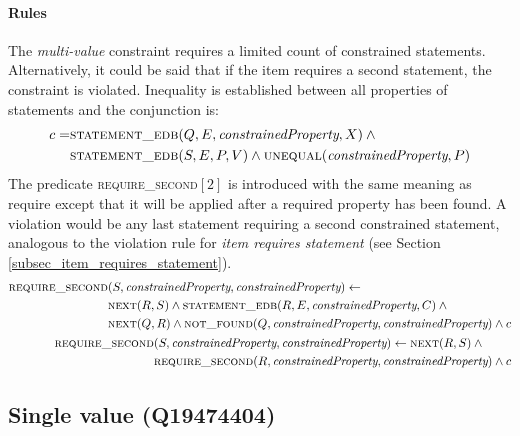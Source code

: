 \documentclass[hyperref,bachelorofscience,fleqn]{cgvpub}
\begin{document}
\paragraph{Rules}
The \emph{multi-value} constraint requires a limited count of constrained statements. Alternatively, it could be said that if the item requires a second statement, the constraint is violated. Inequality is established between all properties of statements and the conjunction is:
\begin{equation}
\begin{split}
c = &\textsc{statement\_edb}(Q, E, \emph{constrainedProperty}, X) \wedge{} \\
&\textsc{statement\_edb}(S, E, P, V) \wedge \textsc{unequal}(\emph{constrainedProperty}, P)
\end{split}
\end{equation}
The predicate \textsc{require\_second}\([2]\) is introduced with the same meaning as require except that it will be applied after a required property has been found. A violation would be any last statement requiring a second constrained statement, analogous to the violation rule for \emph{item requires statement} (see Section \ref{subsec_item_requires_statement}).
\begin{align}
\begin{split}
\textsc{require\_second}&(S, \emph{constrainedProperty}, \emph{constrainedProperty}) \leftarrow \\
&\textsc{next}(R, S) \wedge \textsc{statement\_edb}(R, E, \emph{constrainedProperty}, C) \wedge{} \\
&\textsc{next}(Q, R) \wedge \textsc{not\_found}(Q, \emph{constrainedProperty}, \emph{constrainedProperty})  \wedge c
\end{split}\\
\begin{split}
\textsc{require\_second}&(S, \emph{constrainedProperty}, \emph{constrainedProperty}) \leftarrow \textsc{next}(R, S) \wedge{} \\
&\textsc{require\_second}(R, \emph{constrainedProperty}, \emph{constrainedProperty}) \wedge c
\end{split}
\end{align}

\subsection{Single value (Q19474404)}\label{subsec_single_value}
\end{document}
